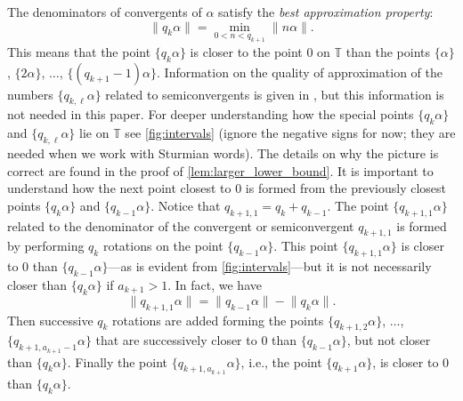 \documentclass[a4paper,fleqn]{article}
\providecommand{\norm}[1]{\lVert#1\rVert}
\newcommand{\T}{\mathbb{T}}
\begin{document}
  The denominators of convergents of $\alpha$ satisfy the \emph{best approximation property}:
  \begin{equation*}
    \norm{q_k \alpha} = \min_{0 < n < q_{k+1}} \norm{n\alpha}.
  \end{equation*}
  This means that the point $\{q_k\alpha\}$ is closer to the point $0$ on $\T$ than the points $\{\alpha\}$,
  $\{2\alpha\}$, $\ldots$, $\{(q_{k+1} - 1)\alpha\}$. Information on the quality of approximation of the numbers
  $\{q_{k,\ell}\alpha\}$ related to semiconvergents is given in
  \cite[Prop.~2.2]{2015:characterization_of_repetitions_in_sturmian_words_a_new}, but this information is not needed in
  this paper. For deeper understanding how the special points $\{q_k\alpha\}$ and $\{q_{k,\ell}\alpha\}$ lie on $\T$
  see \autoref{fig:intervals} (ignore the negative signs for now; they are needed when we work with Sturmian words).
  The details on why the picture is correct are found in the proof of \autoref{lem:larger_lower_bound}. It is important
  to understand how the next point closest to $0$ is formed from the previously closest points $\{q_k\alpha\}$ and
  $\{q_{k-1}\alpha\}$. Notice that $q_{k+1,1} = q_k + q_{k-1}$. The point $\{q_{k+1,1}\alpha\}$ related to the
  denominator of the convergent or semiconvergent $q_{k+1,1}$ is formed by performing $q_k$ rotations on the point
  $\{q_{k-1}\alpha\}$. This point $\{q_{k+1,1}\alpha\}$ is closer to $0$ than $\{q_{k-1}\alpha\}$---as is evident from
  \autoref{fig:intervals}---but it is not necessarily closer than $\{q_k\alpha\}$ if $a_{k+1} > 1$. In fact, we have
  \begin{equation*}
    \norm{q_{k+1,1}\alpha} = \norm{q_{k-1}\alpha} - \norm{q_k\alpha}.
  \end{equation*}
  Then successive $q_k$ rotations are added forming the points $\{q_{k+1,2}\alpha\}$, $\ldots$,
  $\{q_{k+1,a_{k+1}-1}\alpha\}$ that are successively closer to $0$ than $\{q_{k-1}\alpha\}$, but not closer than
  $\{q_k\alpha\}$. Finally the point $\{q_{k+1,a_{k+1}}\alpha\}$, i.e., the point $\{q_{k+1}\alpha\}$, is closer to $0$
  than $\{q_k\alpha\}$.
\end{document}
